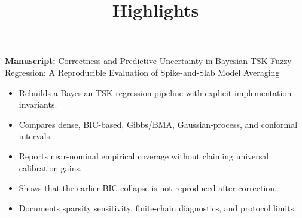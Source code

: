 \documentclass[11pt]{article}
\title{Highlights}
\author{}
\date{}
\begin{document}
\maketitle

\noindent\textbf{Manuscript:} Correctness and Predictive Uncertainty in Bayesian TSK Fuzzy Regression: A Reproducible Evaluation of Spike-and-Slab Model Averaging

\vspace{1.5em}

\begin{itemize}[leftmargin=*, labelsep=0.5em]
\item Rebuilds a Bayesian TSK regression pipeline with explicit implementation invariants.
\item Compares dense, BIC-based, Gibbs/BMA, Gaussian-process, and conformal intervals.
\item Reports near-nominal empirical coverage without claiming universal calibration gains.
\item Shows that the earlier BIC collapse is not reproduced after correction.
\item Documents sparsity sensitivity, finite-chain diagnostics, and protocol limits.
\end{itemize}
\end{document}
